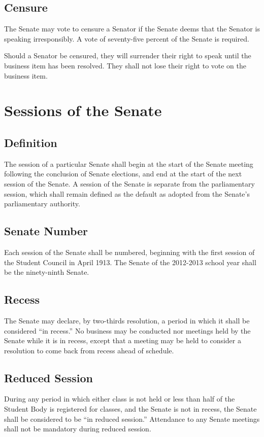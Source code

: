 \documentclass[12pt]{scrreprt}
\begin{document}
\subsection{Censure}
The Senate may vote to censure a Senator if the Senate deems that the Senator 
is speaking irresponsibly. A vote of seventy-five percent of the Senate is 
required. 

Should a Senator be censured, they will surrender their right to speak until 
the business item has been resolved. They shall not lose their right to vote 
on the business item. 

\section{Sessions of the Senate} \label{sec:senate_sessions}

\subsection{Definition}
The session of a particular Senate shall begin at the start of the Senate 
meeting following the conclusion of Senate elections, and end at the start of 
the next session of the Senate. A session of the Senate is separate from the
parliamentary session, which shall remain defined as the default as adopted
from the Senate’s parliamentary authority.

\subsection{Senate Number}
Each session of the Senate shall be numbered, beginning with the first session 
of the Student Council in April 1913. The Senate of the 2012-2013 school year 
shall be the ninety-ninth Senate. 

\subsection{Recess}
The Senate may declare, by two-thirds resolution, a period in which it shall 
be considered ``in recess.'' No business may be conducted nor meetings held by 
the Senate while it is in recess, except that a meeting may be held to 
consider a resolution to come back from recess ahead of schedule. 

\subsection{Reduced Session}
During any period in which either class is not held or less than half of the 
Student Body is registered for classes, and the Senate is not in recess, the 
Senate shall be considered to be ``in reduced session.'' Attendance to any 
Senate meetings shall not be mandatory during reduced session. 
\end{document}
